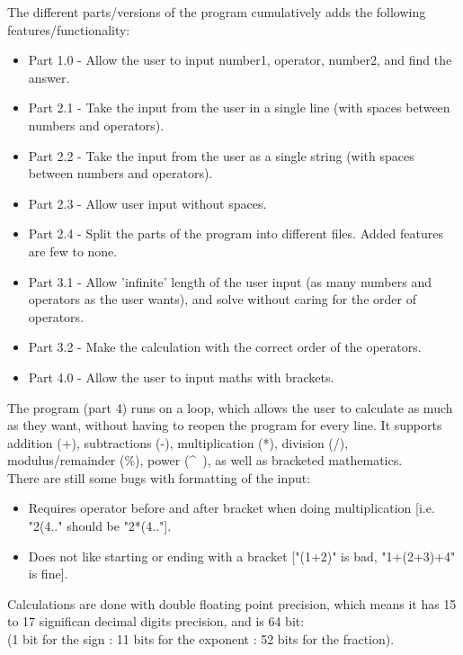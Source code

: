 \documentclass{article}
\begin{document}
	
			The different parts/versions of the program cumulatively adds the following features/functionality:
			\begin{itemize}
				\item Part 1.0	- Allow the user to input number1, operator, number2, and find the answer.
				\item Part 2.1	- Take the input from the user in a single line (with spaces between numbers and operators).
				\item Part 2.2	- Take the input from the user as a single string (with spaces between numbers and operators).
				\item Part 2.3	- Allow user input without spaces.
				\item Part 2.4	- Split the parts of the program into different files. Added features are few to none.
				\item Part 3.1	- Allow 'infinite' length of the user input (as many numbers and operators as the user wants), and solve without caring for the order of operators.
				\item Part 3.2	- Make the calculation with the correct order of the operators.
				\item Part 4.0	- Allow the user to input maths with brackets.
			\end{itemize}
	
			The program (part 4) runs on a loop, which allows the user to calculate as much as they want, without having to reopen the program for every line.
			It supports addition (+), subtractions (-), multiplication (*), division (/), modulus/remainder (\%), power (\^~), as well as bracketed mathematics. \\
			There are still some bugs with formatting of the input:
			\begin{itemize}
				\item Requires operator before and after bracket when doing multiplication [i.e. "2(4.." should be "2*(4.."].
				\item Does not like starting or ending with a bracket ["(1+2)" is bad, "1+(2+3)+4" is fine].
			\end{itemize}
			
			Calculations are done with double floating point precision, which means it has 15 to 17 significan decimal digits precision, and is 64 bit: \\
			(1 bit for the sign : 11 bits for the exponent : 52 bits for the fraction). \cite{doubleArithmetic} \cite{wikiDouble}
	
\end{document}
